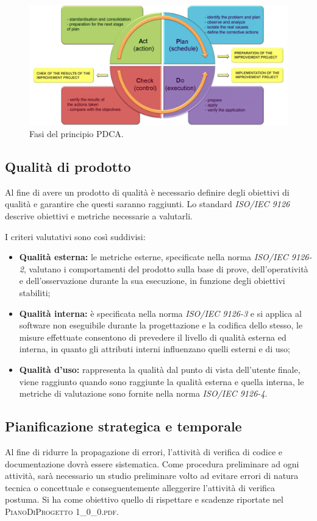	\begin{figure}[H]
		\centering
		\includegraphics[scale=0.6]{includes/img/pdca.png}
		\caption{Fasi del principio PDCA.}
	\end{figure}
	
	\subsection{Qualità di prodotto}
	Al fine di avere un prodotto di qualità è necessario definire degli obiettivi di qualità e garantire che questi saranno raggiunti. 
	Lo standard \textit{ISO/IEC 9126} descrive obiettivi e metriche necessarie a valutarli.
	
	I criteri valutativi sono così suddivisi:
	
	\begin{itemize}
		\item \textbf{Qualità esterna: }le metriche esterne, specificate nella norma \textit{ISO/IEC 9126-2}, valutano i comportamenti del prodotto sulla base di prove, dell'operatività e dell'osservazione durante la sua esecuzione, in funzione degli obiettivi stabiliti;
		\item \textbf{Qualità interna: }è specificata nella norma \textit{ISO/IEC 9126-3} e si applica al software non eseguibile
		durante la progettazione e la codifica dello stesso, le misure effettuate consentono di prevedere il livello di qualità esterna ed interna, in quanto gli attributi interni influenzano quelli esterni e di uso;
		\item \textbf{Qualità d'uso: }rappresenta la qualità dal punto di vista dell'utente finale, viene raggiunto quando sono raggiunte la qualità esterna e quella interna, le metriche di valutazione sono fornite nella norma \textit{ISO/IEC 9126-4}.
	\end{itemize}
	
	
	\subsection{Pianificazione strategica e temporale}
	Al fine di ridurre la propagazione di errori, l’attività di verifica di codice e documentazione dovrà essere sistematica. 
	Come procedura preliminare ad ogni attività, sarà necessario un studio preliminare volto ad evitare errori di natura tecnica o concettuale e conseguentemente alleggerire l’attività di verifica postuma.
	Si ha come obiettivo quello di rispettare e scadenze riportate nel \textsc{PianoDiProgetto 1\_0\_0.pdf}.
	
